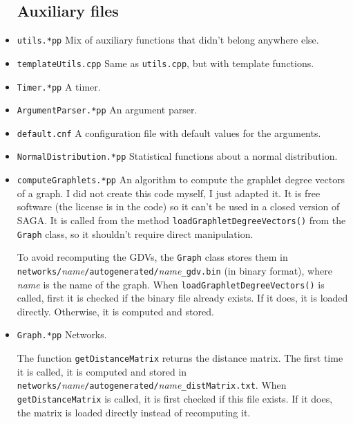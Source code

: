 \documentclass[]{article}
\begin{document}
\begin{itemize}

\subsection{Auxiliary files}


\item \texttt{utils.*pp} Mix of auxiliary functions that didn't belong anywhere else.

\item \texttt{templateUtils.cpp} Same as \texttt{utils.cpp}, but with template functions.

\item \texttt{Timer.*pp} A timer.

\item \texttt{ArgumentParser.*pp} An argument parser.

\item \texttt{default.cnf} A configuration file with default values for the arguments.

\item \texttt{NormalDistribution.*pp} Statistical functions about a normal distribution.

\item \texttt{computeGraphlets.*pp} An algorithm to compute the graphlet degree vectors of a graph. I did not create this code myself, I just adapted it. It is free software (the license is in the code) so it can't be used in a closed version of SAGA. It is called from the method \texttt{loadGraphletDegreeVectors()} from the \texttt{Graph} class, so it shouldn't require direct manipulation.

To avoid recomputing the GDVs, the \texttt{Graph} class stores them in \\ \texttt{networks/}\textit{name}\texttt{/autogenerated/}\textit{name}\texttt{\_gdv.bin} (in binary format), where \textit{name} is the name of the graph. When \texttt{loadGraphletDegreeVectors()} is called, first it is checked if the binary file already exists. If it does, it is loaded directly. Otherwise, it is computed and stored.

\item \texttt{Graph.*pp} Networks.

The function \texttt{getDistanceMatrix} returns the distance matrix. The first time it is called, it is computed and stored in\\ \texttt{networks/}\textit{name}\texttt{/autogenerated/}\textit{name}\texttt{\_distMatrix.txt}. When \texttt{getDistanceMatrix} is called, it is first checked if this file exists. If it does, the matrix is loaded directly instead of recomputing it.


\end{itemize}
\end{document}
